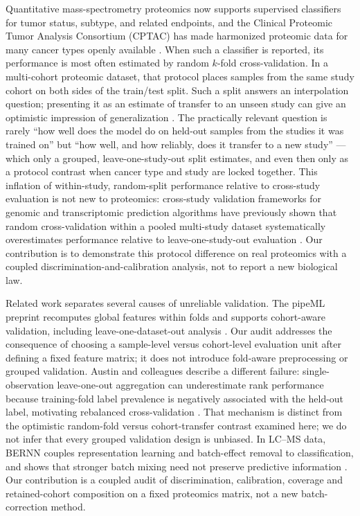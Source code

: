 \documentclass[journal=jprobs,manuscript=article,hyperref,doi=true]{achemso}
\begin{document}
Quantitative mass-spectrometry proteomics now supports supervised classifiers for tumor status, subtype, and
related endpoints, and the Clinical Proteomic Tumor Analysis Consortium (CPTAC) has made harmonized proteomic data
for many cancer types openly available \citep{CPTACportal,CPTACpancancer}. When such a classifier is reported, its
performance is most often estimated by random $k$-fold cross-validation. In a multi-cohort proteomic dataset, that
protocol places samples from the same study cohort on both sides of the train/test split. Such a split answers an interpolation question; presenting it as an estimate of transfer to an unseen study can give an optimistic impression of generalization \citep{KapoorLeakage}. The practically relevant question is rarely ``how well does the model do on held-out
samples from the studies it was trained on'' but ``how well, and how reliably, does it transfer to a new
study'' --- which only a grouped, leave-one-study-out split estimates, and even then only as a protocol
contrast when cancer type and study are locked together. This inflation of within-study, random-split
performance relative to cross-study evaluation is not new to proteomics: cross-study validation frameworks
for genomic and transcriptomic prediction algorithms have previously shown that random cross-validation
within a pooled multi-study dataset systematically overestimates performance relative to leave-one-study-out
evaluation \citep{BernauCrossStudy}. Our contribution is to demonstrate this protocol difference on real
proteomics with a coupled discrimination-and-calibration analysis, not to report a new biological law.

Related work separates several causes of unreliable validation. The pipeML preprint recomputes
global features within folds and supports cohort-aware validation, including leave-one-dataset-out
analysis \citep{HurtadoPipeML}. Our audit addresses the consequence of choosing a sample-level
versus cohort-level evaluation unit after defining a fixed feature matrix; it does not introduce
fold-aware preprocessing or grouped validation. Austin and colleagues describe a different failure:
single-observation leave-one-out aggregation can underestimate rank performance because training-fold
label prevalence is negatively associated with the held-out label, motivating rebalanced
cross-validation \citep{AustinDistributional}. That mechanism is distinct from the optimistic
random-fold versus cohort-transfer contrast examined here; we do not infer that every grouped
validation design is unbiased. In LC--MS data, BERNN couples representation learning and
batch-effect removal to classification, and shows that stronger batch mixing need not preserve
predictive information \citep{PelletierBERNN}. Our contribution is a coupled audit of discrimination,
calibration, coverage and retained-cohort composition on a fixed proteomics matrix, not a new
batch-correction method.
\end{document}
